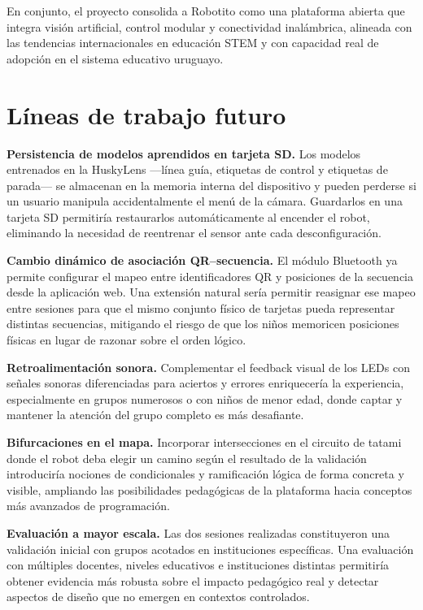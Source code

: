 \documentclass{prgrado}
\begin{document}
En conjunto, el proyecto consolida a Robotito como una plataforma abierta que integra visión artificial, control modular y conectividad inalámbrica, alineada con las tendencias internacionales en educación STEM y con capacidad real de adopción en el sistema educativo uruguayo.

\section{Líneas de trabajo futuro}

\textbf{Persistencia de modelos aprendidos en tarjeta SD.} Los modelos entrenados en la HuskyLens ---línea guía, etiquetas de control y etiquetas de parada--- se almacenan en la memoria interna del dispositivo y pueden perderse si un usuario manipula accidentalmente el menú de la cámara. Guardarlos en una tarjeta SD permitiría restaurarlos automáticamente al encender el robot, eliminando la necesidad de reentrenar el sensor ante cada desconfiguración.

\textbf{Cambio dinámico de asociación QR--secuencia.} El módulo Bluetooth ya permite configurar el mapeo entre identificadores QR y posiciones de la secuencia desde la aplicación web. Una extensión natural sería permitir reasignar ese mapeo entre sesiones para que el mismo conjunto físico de tarjetas pueda representar distintas secuencias, mitigando el riesgo de que los niños memoricen posiciones físicas en lugar de razonar sobre el orden lógico.

\textbf{Retroalimentación sonora.} Complementar el feedback visual de los LEDs con señales sonoras diferenciadas para aciertos y errores enriquecería la experiencia, especialmente en grupos numerosos o con niños de menor edad, donde captar y mantener la atención del grupo completo es más desafiante.

\textbf{Bifurcaciones en el mapa.} Incorporar intersecciones en el circuito de tatami donde el robot deba elegir un camino según el resultado de la validación introduciría nociones de condicionales y ramificación lógica de forma concreta y visible, ampliando las posibilidades pedagógicas de la plataforma hacia conceptos más avanzados de programación.

\textbf{Evaluación a mayor escala.} Las dos sesiones realizadas constituyeron una validación inicial con grupos acotados en instituciones específicas. Una evaluación con múltiples docentes, niveles educativos e instituciones distintas permitiría obtener evidencia más robusta sobre el impacto pedagógico real y detectar aspectos de diseño que no emergen en contextos controlados.
 
\end{document}
